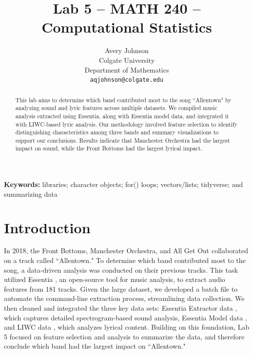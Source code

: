 \documentclass{article}\usepackage[]{graphicx}\usepackage[]{xcolor}
\begin{document}
\vspace{-1in}
\title{Lab 5 -- MATH 240 -- Computational Statistics}

\author{
  Avery Johnson \\
  Colgate University  \\
  Department of Mathematics  \\
  {\tt aqjohnson@colgate.edu}
}

\date{}

\maketitle

\begin{multicols}{2}
\begin{abstract}
This lab aims to determine which band contributed most to the song ``Allentown" by analyzing sound and lyric features across multiple datasets.
We compiled music analysis extracted using Essentia, along with Essentia model data, and integrated it with LIWC-based lyric analysis. Our methodology involved feature selection to identify distinguishing characteristics among three bands and summary visualizations to support our conclusions. Results indicate that Manchester Orchestra had the largest impact on sound, while the Front Bottoms had the largest lyrical impact.

\end{abstract}

\noindent \textbf{Keywords:} libraries; character objects; for() loops;  vectors/lists; tidyverse; and summarizing data

\section{Introduction}

In 2018, the Front Bottoms, Manchester Orchestra, and All Get Out collaborated on a track called ``Allentown." To determine which band contributed most to the song, a data-driven analysis was conducted on their previous tracks. This task utilized Essentia \citep{essentia}, an open-source tool for music analysis, to extract audio features from 181 tracks. Given the large dataset, we developed a batch file to automate the command-line extraction process, streamlining data collection. We then cleaned and integrated the three key data sets: Essentia Extractor data \citep{essentia}, which captures detailed spectrogram-based sound analysis, Essentia Model data \citep{essentiamodel}, and LIWC data \citep{liwc}, which analyzes lyrical content. Building on this foundation, Lab 5 focused on feature selection and analysis to summarize the data, and therefore conclude which band had the largest impact on ``Allentown."


\end{multicols}
\end{document}
